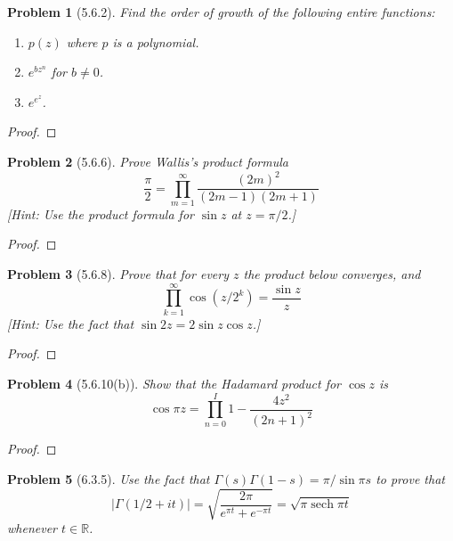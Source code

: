 \documentclass[10pt]{article}
\newcommand{\sk}{\vskip 10mm}
\newcommand{\bb}[1]{\mathbb{#1}}
\DeclareMathOperator{\sech}{sech}
\theoremstyle{plain}
\newtheorem{problem}{Problem}
\theoremstyle{remark}
\begin{document}
\begin{problem}[5.6.2]
  Find the order of growth of the following entire functions:
  \begin{enumerate}
  \item[(a)] $p(z)$ where $p$ is a polynomial.
  \item[(b)] $e^{bz^n}$ for $b\neq 0$.
  \item[(c)] $e^{e^z}$.
  \end{enumerate}
\end{problem}

\begin{proof}
  
\end{proof}

\sk

\begin{problem}[5.6.6]
  Prove Wallis's product formula
  \[
    \frac{\pi}{2}=\prod_{m=1}^\infty\frac{(2m)^2}{(2m-1)(2m+1)}
  \]
  [Hint: Use the product formula for $\sin z$ at $z=\pi/2$.]
\end{problem}

\begin{proof}
  
\end{proof}

\sk

\begin{problem}[5.6.8]
  Prove that for every $z$ the product below converges, and
  \[
    \prod_{k=1}^\infty \cos(z/2^k)=\frac{\sin z}{z}
  \]
  [Hint: Use the fact that $\sin 2z=2\sin z\cos z$.]
\end{problem}

\begin{proof}
  
\end{proof}

\sk

\begin{problem}[5.6.10(b)]
  Show that the Hadamard product for $\cos z$ is 
  \[
    \cos\pi z=\prod_{n=0}^I 1-\frac{4z^2}{(2n+1)^2}
  \]
\end{problem}

\begin{proof}
  
\end{proof}

\sk

\begin{problem}[6.3.5]
  Use the fact that $\Gamma(s)\Gamma(1-s)=\pi/\sin\pi s$ to prove that
  \[
    |\Gamma(1/2+it)|=\sqrt{\frac{2\pi}{e^{\pi t}+e^{-\pi t}}}=\sqrt{\pi\sech{\pi t}}
  \]
  whenever $t\in \bb{R}$.
\end{problem}
\end{document}
